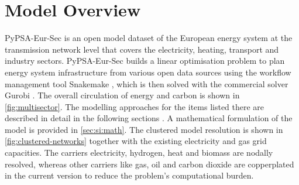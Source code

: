 \section{Model Overview}
\label{sec:si:model-overview}


PyPSA-Eur-Sec is an open model dataset of the European energy system at the
transmission network level that covers the electricity, heating, transport and
industry sectors. PyPSA-Eur-Sec builds a linear optimisation problem to plan
energy system infrastructure from various open data sources using the workflow
management tool Snakemake , which is then solved with the
commercial solver Gurobi . The overall circulation of energy and
carbon is shown in \cref{fig:multisector}. The modelling approaches for the
items listed there are described in detail in the following sections
. A mathematical
formulation of the model is provided in \cref{sec:si:math}. The clustered model
resolution is shown in \cref{fig:clustered-networks} together with the existing
electricity and gas grid capacities. The carriers electricity, hydrogen, heat
and biomass are nodally resolved, whereas other carriers like gas, oil and
carbon dioxide are copperplated in the current version to reduce the problem's
computational burden.
